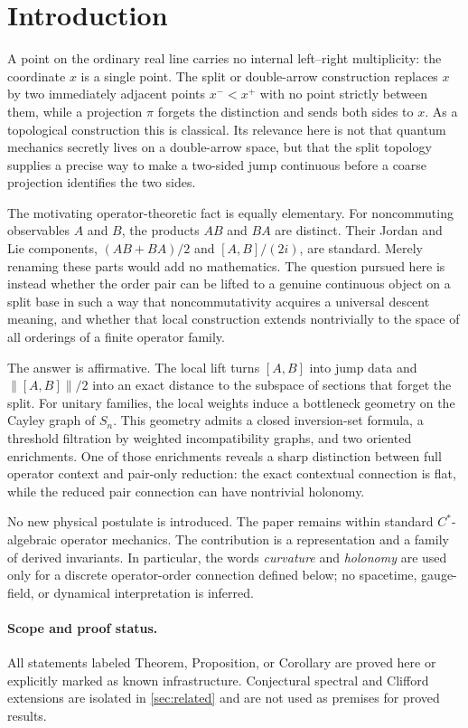\section{Introduction}
A point on the ordinary real line carries no internal left--right multiplicity: the coordinate $x$ is a single point. The split or double-arrow construction replaces $x$ by two immediately adjacent points $x^-<x^+$ with no point strictly between them, while a projection $\pi$ forgets the distinction and sends both sides to $x$. As a topological construction this is classical. Its relevance here is not that quantum mechanics secretly lives on a double-arrow space, but that the split topology supplies a precise way to make a two-sided jump continuous before a coarse projection identifies the two sides.

The motivating operator-theoretic fact is equally elementary. For noncommuting observables $A$ and $B$, the products $AB$ and $BA$ are distinct. Their Jordan and Lie components, $(AB+BA)/2$ and $[A,B]/(2i)$, are standard. Merely renaming these parts would add no mathematics. The question pursued here is instead whether the order pair can be lifted to a genuine continuous object on a split base in such a way that noncommutativity acquires a universal descent meaning, and whether that local construction extends nontrivially to the space of all orderings of a finite operator family.

The answer is affirmative. The local lift turns $[A,B]$ into jump data and $\|[A,B]\|/2$ into an exact distance to the subspace of sections that forget the split. For unitary families, the local weights induce a bottleneck geometry on the Cayley graph of $S_n$. This geometry admits a closed inversion-set formula, a threshold filtration by weighted incompatibility graphs, and two oriented enrichments. One of those enrichments reveals a sharp distinction between full operator context and pair-only reduction: the exact contextual connection is flat, while the reduced pair connection can have nontrivial holonomy.

No new physical postulate is introduced. The paper remains within standard $C^*$-algebraic operator mechanics. The contribution is a representation and a family of derived invariants. In particular, the words \emph{curvature} and \emph{holonomy} are used only for a discrete operator-order connection defined below; no spacetime, gauge-field, or dynamical interpretation is inferred.

\paragraph{Scope and proof status.} All statements labeled Theorem, Proposition, or Corollary are proved here or explicitly marked as known infrastructure. Conjectural spectral and Clifford extensions are isolated in \cref{sec:related} and are not used as premises for proved results.


